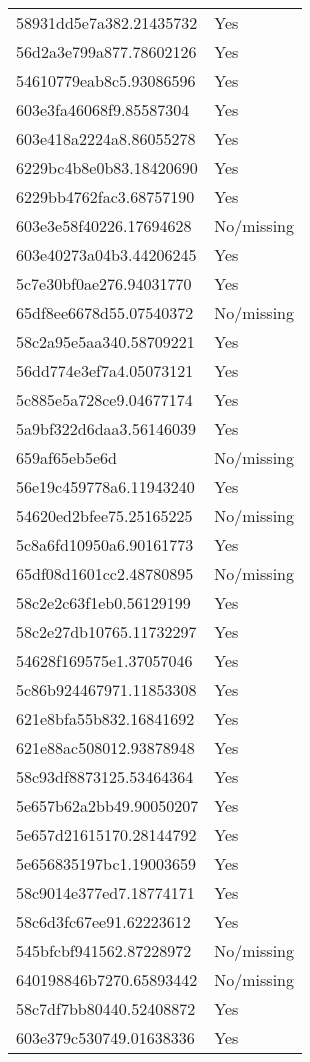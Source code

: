 \begin{tabular}{ll}
58931dd5e7a382.21435732 & Yes \\
56d2a3e799a877.78602126 & Yes \\
54610779eab8c5.93086596 & Yes \\
603e3fa46068f9.85587304 & Yes \\
603e418a2224a8.86055278 & Yes \\
6229bc4b8e0b83.18420690 & Yes \\
6229bb4762fac3.68757190 & Yes \\
603e3e58f40226.17694628 & No/missing \\
603e40273a04b3.44206245 & Yes \\
5c7e30bf0ae276.94031770 & Yes \\
65df8ee6678d55.07540372 & No/missing \\
58c2a95e5aa340.58709221 & Yes \\
56dd774e3ef7a4.05073121 & Yes \\
5c885e5a728ce9.04677174 & Yes \\
5a9bf322d6daa3.56146039 & Yes \\
659af65eb5e6d & No/missing \\
56e19c459778a6.11943240 & Yes \\
54620ed2bfee75.25165225 & No/missing \\
5c8a6fd10950a6.90161773 & Yes \\
65df08d1601cc2.48780895 & No/missing \\
58c2e2c63f1eb0.56129199 & Yes \\
58c2e27db10765.11732297 & Yes \\
54628f169575e1.37057046 & Yes \\
5c86b924467971.11853308 & Yes \\
621e8bfa55b832.16841692 & Yes \\
621e88ac508012.93878948 & Yes \\
58c93df8873125.53464364 & Yes \\
5e657b62a2bb49.90050207 & Yes \\
5e657d21615170.28144792 & Yes \\
5e656835197bc1.19003659 & Yes \\
58c9014e377ed7.18774171 & Yes \\
58c6d3fc67ee91.62223612 & Yes \\
545bfcbf941562.87228972 & No/missing \\
640198846b7270.65893442 & No/missing \\
58c7df7bb80440.52408872 & Yes \\
603e379c530749.01638336 & Yes \\

\end{tabular}
